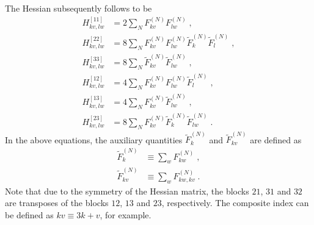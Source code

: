 \documentclass[aip,amsmath,amssymb,reprint]{revtex4-1}
\begin{document}
%
The Hessian subsequently follows to be
%
\begin{subequations}
 \begin{align}
  H^{[11]}_{kv,lw} &= 2\sum_N F^{(N)}_{kv} F^{(N)}_{lw} \;,\\
  H^{[22]}_{kv,lw} &= 8\sum_N F^{(N)}_{kv} F^{(N)}_{lw} \widetilde{F}^{(N)}_k \widetilde{F}^{(N)}_l \;,\\
  H^{[33]}_{kv,lw} &= 8\sum_N \widetilde{F}^{(N)}_{kv} \widetilde{F}^{(N)}_{lw} \;,\\
  H^{[12]}_{kv,lw} &= 4\sum_N F^{(N)}_{kv} F^{(N)}_{lw} \widetilde{F}^{(N)}_l \;,\\
  H^{[13]}_{kv,lw} &= 4\sum_N F^{(N)}_{kv} \widetilde{F}^{(N)}_{lw} \;,\\
  H^{[23]}_{kv,lw} &= 8\sum_N F^{(N)}_{kv} \widetilde{F}^{(N)}_k \widetilde{F}^{(N)}_{lw} \;.
 \end{align}
\end{subequations}
%
In the above equations, the auxiliary quantities $\widetilde{F}^{(N)}_k$ 
and $\widetilde{F}^{(N)}_{kv}$ are defined as
%
\begin{subequations}
 \begin{align}
  \widetilde{F}^{(N)}_k    &\equiv \sum_w F^{(N)}_{kw} \;,\\
  \widetilde{F}^{(N)}_{kv} &\equiv \sum_w F^{(N)}_{kw,kv} \;.
 \end{align}
\end{subequations}
%
Note that due to the symmetry of the Hessian matrix, the blocks $21$, $31$ and $32$
are transposes of the blocks $12$, $13$ and $23$, respectively. The composite index
can be defined as $kv \equiv 3k+v$, for example.

\end{document}
